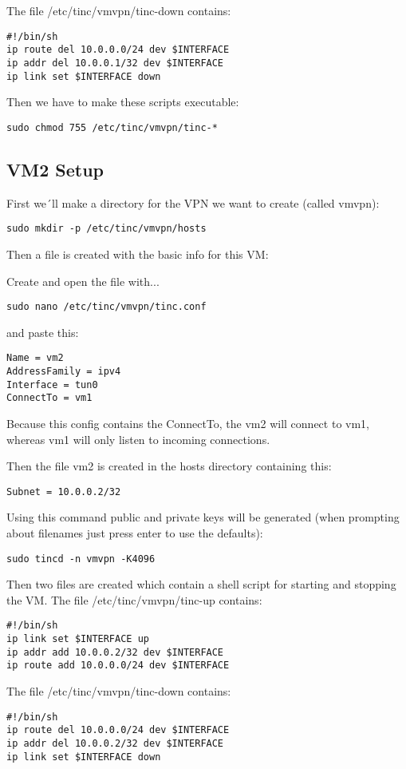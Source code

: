 \documentclass[10pt,a4paper]{article}
\begin{document}
The file /etc/tinc/vmvpn/tinc-down contains:
\begin{verbatim}
#!/bin/sh
ip route del 10.0.0.0/24 dev $INTERFACE
ip addr del 10.0.0.1/32 dev $INTERFACE
ip link set $INTERFACE down
\end{verbatim}

Then we have to make these scripts executable:
\begin{verbatim}
sudo chmod 755 /etc/tinc/vmvpn/tinc-*
\end{verbatim}

\subsection{VM2 Setup}
First we´ll make a directory for the VPN we want to create (called vmvpn):
\begin{verbatim}
sudo mkdir -p /etc/tinc/vmvpn/hosts
\end{verbatim}

Then a file is created with the basic info for this VM:

Create and open the file with...
\begin{verbatim}
sudo nano /etc/tinc/vmvpn/tinc.conf
\end{verbatim}
and paste this:
\begin{verbatim}
Name = vm2
AddressFamily = ipv4
Interface = tun0
ConnectTo = vm1
\end{verbatim}
Because this config contains the ConnectTo, the vm2 will connect to vm1, whereas vm1 will only listen to incoming connections.

Then the file vm2 is created in the hosts directory containing this:
\begin{verbatim}
Subnet = 10.0.0.2/32
\end{verbatim}

Using this command public and private keys will be generated (when prompting about filenames just press enter to use the defaults):
\begin{verbatim}
sudo tincd -n vmvpn -K4096
\end{verbatim}

Then two files are created which contain a shell script for starting and stopping the VM. The file /etc/tinc/vmvpn/tinc-up contains:
\begin{verbatim}
#!/bin/sh
ip link set $INTERFACE up
ip addr add 10.0.0.2/32 dev $INTERFACE
ip route add 10.0.0.0/24 dev $INTERFACE
\end{verbatim}

The file /etc/tinc/vmvpn/tinc-down contains:
\begin{verbatim}
#!/bin/sh
ip route del 10.0.0.0/24 dev $INTERFACE
ip addr del 10.0.0.2/32 dev $INTERFACE
ip link set $INTERFACE down
\end{verbatim}
\end{document}
